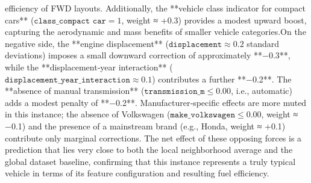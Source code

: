 efficiency of FWD layouts. Additionally, the **vehicle class indicator for compact cars** (\(\texttt{class\_compact car} = 1\), weight ≈ +0.3) provides a modest upward boost, capturing the aerodynamic and mass benefits of smaller vehicle categories.On the negative side, the **engine displacement** (\(\texttt{displacement} \approx 0.2\) standard deviations) imposes a small downward correction of approximately **−0.3**, while the **displacement‑year interaction** (\(\texttt{displacement\_year\_interaction} \approx 0.1\)) contributes a further **−0.2**. The **absence of manual transmission** (\(\texttt{transmission\_m} \leq 0.00\), i.e., automatic) adds a modest penalty of **−0.2**. Manufacturer‑specific effects are more muted in this instance; the absence of Volkswagen (\(\texttt{make\_volkswagen} \leq 0.00\), weight ≈ −0.1) and the presence of a mainstream brand (e.g., Honda, weight ≈ +0.1) contribute only marginal corrections. The net effect of these opposing forces is a prediction that lies very close to both the local neighborhood average and the global dataset baseline, confirming that this instance represents a truly typical vehicle in terms of its feature configuration and resulting fuel efficiency.
